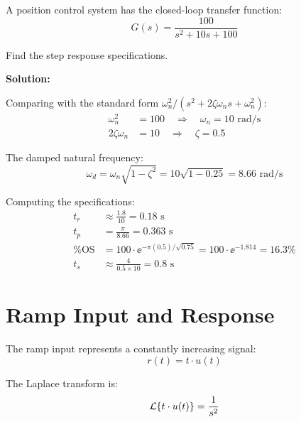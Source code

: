 \begin{examplebox}[title=Example 6.2: Step Response Specifications]
A position control system has the closed-loop transfer function:
\begin{equation}
G(s) = \frac{100}{s^2 + 10s + 100}
\end{equation}

Find the step response specifications.

\textbf{Solution:}

Comparing with the standard form $\omega_n^2/(s^2 + 2\zeta\omega_n s + \omega_n^2)$:
\begin{align}
\omega_n^2 &= 100 \quad \Rightarrow \quad \omega_n = 10 \text{ rad/s} \\
2\zeta\omega_n &= 10 \quad \Rightarrow \quad \zeta = 0.5
\end{align}

The damped natural frequency:
\begin{equation}
\omega_d = \omega_n\sqrt{1-\zeta^2} = 10\sqrt{1-0.25} = 8.66 \text{ rad/s}
\end{equation}

Computing the specifications:
\begin{align}
t_r &\approx \frac{1.8}{10} = 0.18 \text{ s} \\
t_p &= \frac{\pi}{8.66} = 0.363 \text{ s} \\
\%\text{OS} &= 100 \cdot \ee^{-\pi(0.5)/\sqrt{0.75}} = 100 \cdot \ee^{-1.814} = 16.3\% \\
t_s &\approx \frac{4}{0.5 \times 10} = 0.8 \text{ s}
\end{align}
\end{examplebox}

\section{Ramp Input and Response}
\label{sec:ramp}

The ramp input represents a constantly increasing signal:
\begin{equation}
r(t) = t \cdot u(t)
\end{equation}

The Laplace transform is:
\begin{equation}
\mathcal{L}\{t \cdot u(t)\} = \frac{1}{s^2}
\end{equation}

